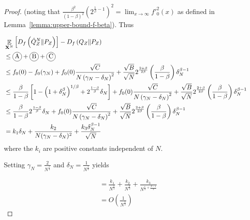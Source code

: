 \begin{proof}
(noting that $\frac{\beta^2}{(1-\beta)^2}\left(2^{\frac{1}{\beta} - 1}\right)^2 = \lim_{x\to\infty} f'^2_0(x)$ as defined in Lemma~\ref{lemma:upper-bound-f-beta}). Thus

\begin{align*}
    &\E_{\XN} \left[ D_f\left( \hat{Q}_Z^N \| P_Z\right)\right] - D_f\left( Q_{Z} \| P_Z\right)\\
    &\leq \encircle{A} + \encircle{B} + \encircle{C} \\
    &\leq f_0(0) - f_0(\gamma_N) + f_0(0) \frac{\sqrt{C}}{N \left( \gamma_N - \delta_N \right)^2} + \frac{\sqrt{B}}{\sqrt{N}}2^{\frac{2+\beta}{2\beta}}\left(\frac{\beta}{1-\beta}\right) \delta_N^{\beta - 1}\\
    &\leq \frac{\beta}{1-\beta}\left[1 - \left(1+\delta_N^\beta\right)^{1/\beta} + 2^{\frac{1-\beta}{\beta}}\delta_N\right] + f_0(0) \frac{\sqrt{C}}{N \left( \gamma_N - \delta_N \right)^2} + \frac{\sqrt{B}}{\sqrt{N}}2^{\frac{2+\beta}{2\beta}}\left(\frac{\beta}{1-\beta}\right) \delta_N^{\beta - 1}\\
    &\leq \frac{\beta}{1-\beta} 2^{\frac{1-\beta}{\beta}}\delta_N + f_0(0) \frac{\sqrt{C}}{N \left( \gamma_N - \delta_N \right)^2}  + \frac{\sqrt{B}}{\sqrt{N}}2^{\frac{2+\beta}{2\beta}}\left(\frac{\beta}{1-\beta}\right) \delta_N^{\beta - 1}\\
    &= k_1 \delta_N + \frac{k_2}{N(\gamma_N - \delta_N)^2} + \frac{k_3\delta_N^{\beta-1}}{\sqrt{N}}
\end{align*}
where the $k_i$ are positive constants independent of $N$.

Setting $\gamma_N = \frac{2}{N^\frac{1}{3}}$ and $\delta_N = \frac{1}{N^\frac{1}{3}}$ yields

\begin{align*}
    &= \frac{k_1}{N^{\frac{1}{3}}}
    + \frac{k_2}{N^{\frac{1}{3}}} 
    + \frac{k_3}{N^{\frac{1}{2}+\frac{\beta-1}{3}}} \\
    &= O\left(\frac{1}{N^\frac{1}{3}}\right)
\end{align*}

\end{proof}